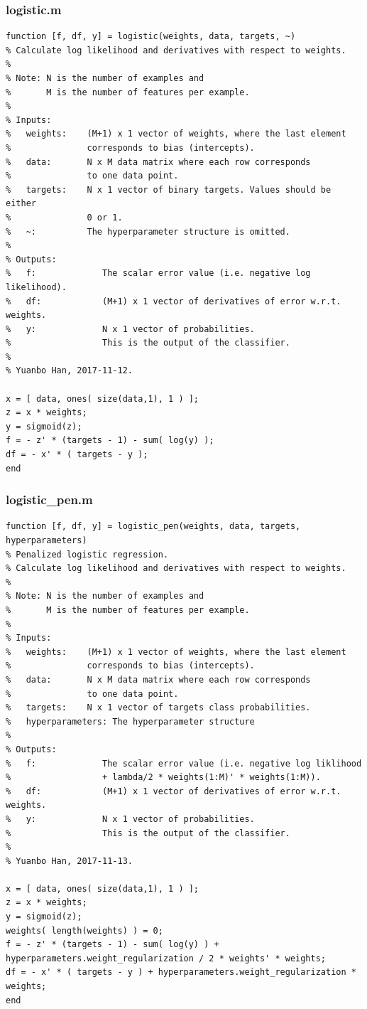 \documentclass{article}
\begin{document}
\subsubsection{logistic.m}
\begin{lstlisting}
function [f, df, y] = logistic(weights, data, targets, ~)
% Calculate log likelihood and derivatives with respect to weights.
%
% Note: N is the number of examples and
%       M is the number of features per example.
%
% Inputs:
% 	weights:    (M+1) x 1 vector of weights, where the last element
%               corresponds to bias (intercepts).
% 	data:       N x M data matrix where each row corresponds
%               to one data point.
%	targets:    N x 1 vector of binary targets. Values should be either
%               0 or 1.
%   ~:          The hyperparameter structure is omitted.
%
% Outputs:
%	f:             The scalar error value (i.e. negative log likelihood).
%	df:            (M+1) x 1 vector of derivatives of error w.r.t. weights.
%   y:             N x 1 vector of probabilities.
%                  This is the output of the classifier.
%
% Yuanbo Han, 2017-11-12.

x = [ data, ones( size(data,1), 1 ) ];
z = x * weights;
y = sigmoid(z);
f = - z' * (targets - 1) - sum( log(y) );
df = - x' * ( targets - y );
end
\end{lstlisting}

\subsubsection{logistic\_pen.m}
\begin{lstlisting}
function [f, df, y] = logistic_pen(weights, data, targets, hyperparameters)
% Penalized logistic regression.
% Calculate log likelihood and derivatives with respect to weights.
%
% Note: N is the number of examples and
%       M is the number of features per example.
%
% Inputs:
% 	weights:    (M+1) x 1 vector of weights, where the last element
%               corresponds to bias (intercepts).
% 	data:       N x M data matrix where each row corresponds
%               to one data point.
%   targets:    N x 1 vector of targets class probabilities.
%   hyperparameters: The hyperparameter structure
%
% Outputs:
%	f:             The scalar error value (i.e. negative log liklihood
%                  + lambda/2 * weights(1:M)' * weights(1:M)).
%	df:            (M+1) x 1 vector of derivatives of error w.r.t. weights.
%   y:             N x 1 vector of probabilities.
%                  This is the output of the classifier.
%
% Yuanbo Han, 2017-11-13.

x = [ data, ones( size(data,1), 1 ) ];
z = x * weights;
y = sigmoid(z);
weights( length(weights) ) = 0;
f = - z' * (targets - 1) - sum( log(y) ) + hyperparameters.weight_regularization / 2 * weights' * weights;
df = - x' * ( targets - y ) + hyperparameters.weight_regularization * weights;
end
\end{lstlisting}
\end{document}
